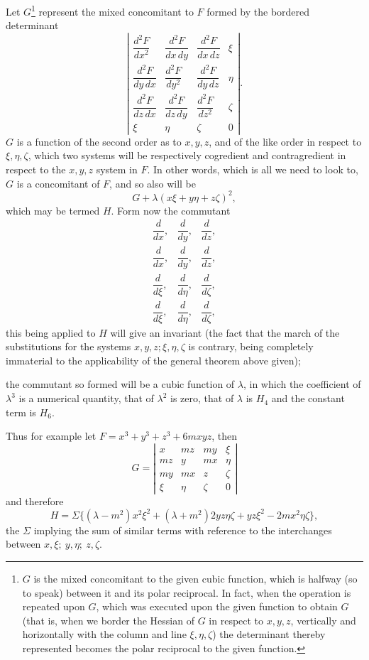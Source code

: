 \documentclass[11pt]{article}
\newcommand{\sourcepage}[1]{\marginpar{\scriptsize p.~#1}}
\begin{document}
{{Let $G$\footnote{$G$ is the mixed concomitant to the given cubic function, which is halfway (so to speak) between it and its polar reciprocal. In fact, when the operation is repeated upon $G$, which was executed upon the given function to obtain $G$ (that is, when we border the Hessian of $G$ in respect to $x,y,z$, vertically and horizontally with the column and line $\xi,\eta,\zeta$) the determinant thereby represented becomes the polar reciprocal to the given function.} represent the mixed concomitant to $F$ formed by the bordered determinant
\[
\left|\begin{array}{cccc}
\dfrac{d^2F}{dx^2}&\dfrac{d^2F}{dx\,dy}&\dfrac{d^2F}{dx\,dz}&\xi\\[0.6em]
\dfrac{d^2F}{dy\,dx}&\dfrac{d^2F}{dy^2}&\dfrac{d^2F}{dy\,dz}&\eta\\[0.6em]
\dfrac{d^2F}{dz\,dx}&\dfrac{d^2F}{dz\,dy}&\dfrac{d^2F}{dz^2}&\zeta\\[0.6em]
\xi&\eta&\zeta&0
\end{array}\right|.
\]
$G$ is a function of the second order as to $x,y,z$, and of the like order in respect to $\xi,\eta,\zeta$, which two systems will be respectively cogredient and contragredient in respect to the $x,y,z$ system in $F$. In other words, which is all we need to look to, $G$ is a concomitant of $F$, and so also will be
\[
G+\lambda(x\xi+y\eta+z\zeta)^2,
\]
which may be termed $H$. Form now the commutant
\[
\begin{array}{ccc}
\dfrac{d}{dx},&\dfrac{d}{dy},&\dfrac{d}{dz},\\[0.6em]
\dfrac{d}{dx},&\dfrac{d}{dy},&\dfrac{d}{dz},\\[0.6em]
\dfrac{d}{d\xi},&\dfrac{d}{d\eta},&\dfrac{d}{d\zeta},\\[0.6em]
\dfrac{d}{d\xi},&\dfrac{d}{d\eta},&\dfrac{d}{d\zeta},
\end{array}
\]
this being applied to $H$ will give an invariant (the fact that the march of the substitutions for the systems $x,y,z;\xi,\eta,\zeta$ is contrary, being completely immaterial to the applicability of the general theorem above given);

\sourcepage{310}
the commutant so formed will be a cubic function of $\lambda$, in which the coefficient of $\lambda^3$ is a numerical quantity, that of $\lambda^2$ is zero, that of $\lambda$ is $H_4$ and the constant term is $H_6$.

Thus for example let $F=x^3+y^3+z^3+6mxyz$, then
\[
G=\left|\begin{array}{cccc}
x&mz&my&\xi\\
mz&y&mx&\eta\\
my&mx&z&\zeta\\
\xi&\eta&\zeta&0
\end{array}\right|
\]
and therefore
\[
H=\Sigma\{(\lambda-m^2)x^2\xi^2+(\lambda+m^2)2yz\eta\zeta
+yz\xi^2-2mx^2\eta\zeta\},
\]
the $\Sigma$ implying the sum of similar terms with reference to the interchanges between $x,\xi;\ y,\eta;\ z,\zeta$.

}}
\end{document}
